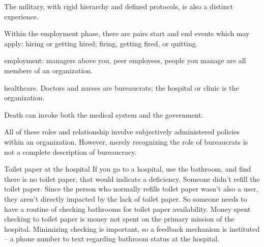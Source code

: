 The military, with rigid hierarchy and defined protocols, is also a distinct experience. 



Within the employment phase, there are pairs start and end events which may apply: hiring or getting hired; firing, getting fired, or quitting. 

employment: managers above you, peer employees, people you manage are all members of an organization. 

healthcare. Doctors and nurses are bureaucrats; the hospital or clinic is the organization. 


Death can invoke both the medical system and the government. 





All of these roles and relationship involve subjectively administered policies within an organization. However, merely recognizing the role of bureaucrats is not a complete description of bureaucracy. 



Toilet paper at the hospital
If you go to a hospital, use the bathroom, and find there is no toilet paper, that would indicate a deficiency.
Someone didn't refill the toilet paper. Since the person who normally refills toilet paper wasn't also a user, they aren't directly impacted by the lack of toilet paper.
So someone needs to have a routine of checking bathrooms for toilet paper availability. Money spent checking to toilet paper is money not spent on the primary mission of the hospital.
Minimizing checking is important, so a feedback mechanism is instituted -- a phone number to text regarding bathroom status at the hospital.
